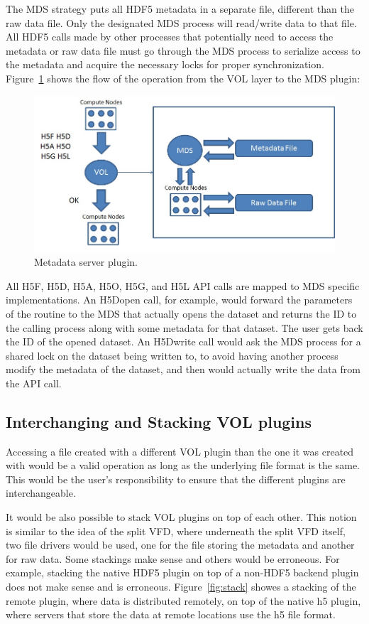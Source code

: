 \documentclass[letterpaper,hyper]{THG_RFC}
\begin{document}
The MDS strategy puts all HDF5 metadata in a separate file, different than the raw data file. Only the designated MDS process will read/write data to that file. All HDF5 calls made by other processes that potentially need to access the metadata or raw data file must go through the MDS process to serialize access to the metadata and acquire the necessary locks for proper synchronization. Figure~\ref{fig:mds} shows the flow of the operation from the VOL layer to the MDS plugin:

\begin{figure}[ht!]
\centering
\includegraphics[width=170mm]{pics/plugin-mds.jpg}
\caption{Metadata server plugin.}
\label{fig:mds}
\end{figure}

All H5F, H5D, H5A, H5O, H5G, and H5L API calls are mapped to MDS specific implementations. An H5Dopen call, for example, would forward the parameters of the routine to the MDS that actually opens the dataset and returns the ID to the calling process along with some metadata for that dataset. The user gets back the ID of the opened dataset. An H5Dwrite call would ask the MDS process for a shared lock on the dataset being written to, to avoid having another process modify the metadata of the dataset, and then would actually write the data from the API call.
\clearpage
\subsection{Interchanging and Stacking VOL plugins}
Accessing a file created with a different VOL plugin than the one it was created with would be a valid operation as long as the underlying file format is the same. This would be the user’s responsibility to ensure that the different plugins are interchangeable. 

It would be also possible to stack VOL plugins on top of each other. This notion is similar to the idea of the split VFD, where underneath the split VFD itself, two file drivers would be used, one for the file storing the metadata and another for raw data. Some stackings make sense and others would be erroneous. For example, stacking the native HDF5 plugin on top of a non-HDF5 backend plugin does not make sense and is erroneous. Figure~\ref{fig:stack} showes a stacking of the remote plugin, where data is distributed remotely, on top of the native h5 plugin, where servers that store the data at remote locations use the h5 file format.
\end{document}
